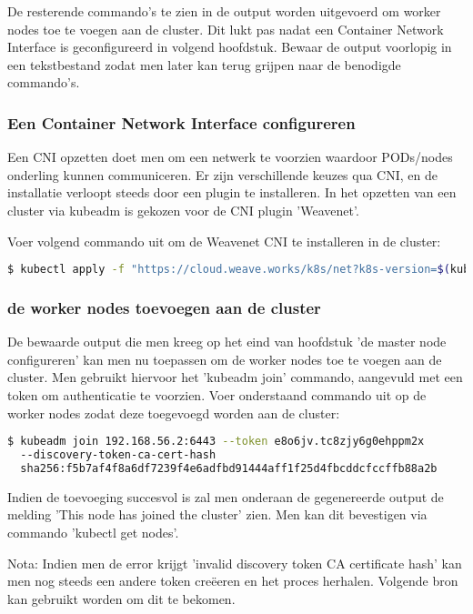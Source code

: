 De resterende commando's te zien in de output worden uitgevoerd om worker nodes toe te voegen aan de cluster. Dit lukt pas nadat een Container Network Interface is geconfigureerd in volgend hoofdstuk. Bewaar de output voorlopig in een tekstbestand zodat men later kan terug grijpen naar de benodigde commando's.

\subsubsection{Een Container Network Interface configureren}

Een CNI opzetten doet men om een netwerk te voorzien waardoor PODs/nodes onderling kunnen communiceren. Er zijn verschillende keuzes qua CNI, en de installatie verloopt steeds door een plugin te installeren. In het opzetten van een cluster via kubeadm is gekozen voor de CNI plugin 'Weavenet'. \autocite{Weaveworks2022}

Voer volgend commando uit om de Weavenet CNI te installeren in de cluster: 
\begin{lstlisting}[language=bash]
$ kubectl apply -f "https://cloud.weave.works/k8s/net?k8s-version=$(kubectl version | base64 | tr -d '\n')"
\end{lstlisting}

\subsubsection{de worker nodes toevoegen aan de cluster}

De bewaarde output die men kreeg op het eind van hoofdstuk 'de master node configureren' kan men nu toepassen om de worker nodes toe te voegen aan de cluster. 
Men gebruikt hiervoor het 'kubeadm join' commando, aangevuld met een token om authenticatie te voorzien. Voer onderstaand commando uit op de worker nodes zodat deze toegevoegd worden aan de cluster:
\begin{lstlisting}[language=bash]
$ kubeadm join 192.168.56.2:6443 --token e8o6jv.tc8zjy6g0ehppm2x 
  --discovery-token-ca-cert-hash
  sha256:f5b7af4f8a6df7239f4e6adfbd91444aff1f25d4fbcddcfccffb88a2b
\end{lstlisting} 

Indien de toevoeging succesvol is zal men onderaan de gegenereerde output de melding 'This node has joined the cluster' zien. Men kan dit bevestigen via commando 'kubectl get nodes'. 

Nota: Indien men de error krijgt 'invalid discovery token CA certificate hash' kan men nog steeds een andere token creëeren en het proces herhalen. Volgende bron kan gebruikt worden om dit te bekomen. \autocite{Mukul2020} 

